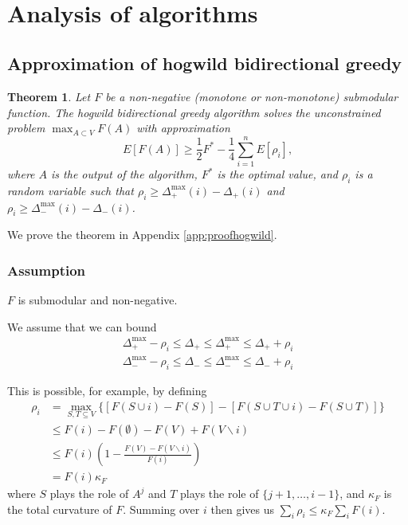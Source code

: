 \documentclass{article} %
\newtheorem{thm}{Theorem}[section]
\begin{document}
~











\section{Analysis of algorithms}

\subsection{Approximation of hogwild bidirectional greedy}
\begin{thm}\label{thm:randomapprox} Let $F$ be a non-negative (monotone or non-monotone) submodular function.
The hogwild bidirectional greedy algorithm solves the unconstrained problem $\max_{A\subset V} F(A)$ with approximation
\[
E[F(A)] \geq \frac{1}{2}F^* - \frac{1}{4}\sum_{i=1}^n E[\rho_i],
\]
where $A$ is the output of the algorithm, $F^*$ is the optimal value, and $\rho_i$ is a random variable such that $\rho_i \geq \Delta_+^{\max}(i) - \Delta_+(i)$ and $\rho_i \geq \Delta_-^{\max}(i) - \Delta_-(i)$.
\end{thm}

We prove the theorem in Appendix \ref{app:proofhogwild}.

\subsubsection{Assumption}
$F$ is submodular and non-negative.

We assume that we can bound
\begin{align*}
\Delta_+^{\max} - \rho_i \leq \Delta_+ \leq \Delta_+^{\max} \leq \Delta_+ + \rho_i\\
\Delta_-^{\max} - \rho_i \leq \Delta_- \leq \Delta_-^{\max} \leq \Delta_- + \rho_i
\end{align*}

This is possible, for example, by defining
\begin{align*}
\rho_i
&= \max_{S,T\subseteq V} \{[F(S\cup i) - F(S)] - [F(S \cup T \cup i) - F(S \cup T)]\}\\
&\leq F(i) - F(\emptyset) - F(V) + F(V\backslash i)\\
&\leq F(i)\left(1 - \frac{F(V) - F(V\backslash i)}{F(i)}\right)\\
&= F(i)\kappa_F
\end{align*}
where $S$ plays the role of $A^j$ and $T$ plays the role of $\{j+1,\dots, i-1\}$, and $\kappa_F$ is the total curvature of $F$.
Summing over $i$ then gives us $\sum_i \rho_i \leq \kappa_F\sum_i F(i)$.
\end{document}
